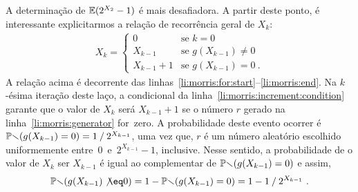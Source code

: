 A determinação de $\mathbb{E}(2^{X_2} - 1)$ é mais desafiadora. A partir deste ponto, é interessante explicitarmos a relação
de recorrência geral de $X_k$:
\begin{align}
  \label{morris:rec:xk}
X_k = \begin{cases} 
  0                 & \mbox{se } k = 0 \\[2mm]
  X_{k-1}           & \mbox{se } g(X_{k-1}) \neq 0 \\[2mm]
  X_{k-1} + 1       & \mbox{se } g(X_{k-1}) =  0\ .  
\end{cases}
\end{align}
A relação acima é decorrente das linhas~\ref{li:morris:for:start}--\ref{li:morris:end}. Na $k$-ésima iteração deste 
laço, a condicional da linha~\ref{li:morris:increment:condition} garante que o valor de $X_k$ será $X_{k-1} + 1$ se o 
número $r$ gerado na linha~\ref{li:morris:generator} for~zero. A probabilidade deste evento ocorrer é 
$\mathbb{Pr}(g(X_{k-1}) = 0) = 1 \mathbin{/} 2^{X_{k-1}}$, uma vez que, $r$ é um número aleatório escolhido uniformemente 
entre~$0$~e~$2^{X_{k-1}} - 1$, inclusive. Nesse sentido, a probabilidade de o valor de $X_k$ ser $X_{k - 1}$ é igual ao 
complementar de $\mathbb{Pr}(g(X_{k-1}) = 0)$ e assim, 
\[\Pbb(g(X_{k-1}) \not\eq 0) = 1 - \Pbb(g(X_{k-1}) = 0) = 1 - 1 \mathbin{/} 2^{X_{k-1}} \ . \]

